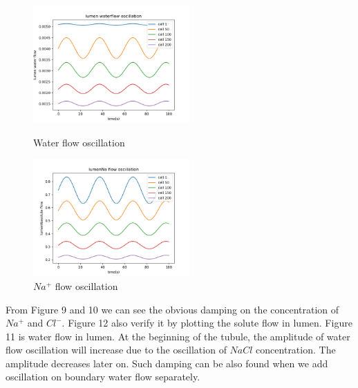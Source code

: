 \documentclass{article}
\begin{document}
\begin{figure}[H]
\centering
\begin{minipage}[t]{0.48\textwidth}
\centering
\includegraphics[width=6cm]{figure/figure11.png}
\caption{Water flow oscillation}
\end{minipage}
\begin{minipage}[t]{0.48\textwidth}
\centering
\includegraphics[width=6cm]{figure/figure12.png}
\caption{$Na^{+}$ flow oscillation}
\end{minipage}
\end{figure}
From Figure 9 and 10 we can see the obvious damping on the concentration of $Na^{+}$ and $Cl^{-}$. Figure 12 also verify it by plotting the solute flow in lumen. Figure 11 is water flow in lumen. At the beginning of the tubule, the amplitude of water flow oscillation will increase due to the oscillation of $NaCl$ concentration. The amplitude decreases later on. Such damping can be also found when we add oscillation on boundary water flow separately.
\end{document}
